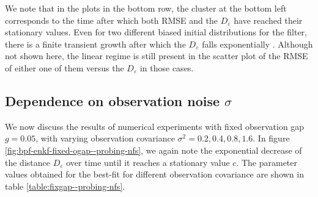 We note that in the plots in the bottom row, the cluster at the bottom left corresponds to the time after which both RMSE and the $D_\varepsilon$ have reached their stationary values. Even for two different biased initial distributions for the filter, there is a finite transient growth after which the $D_\varepsilon$ falls exponentially \cite{mandal2021stability}. Although not shown here, the linear regime is still present in the scatter plot of the RMSE of either one of them versus the $D_\varepsilon$ in those cases. 

\subsection{Dependence on observation noise \texorpdfstring{$\sigma$}{Lg} }

We now discuss the results of numerical experiments with fixed observation gap $g = 0.05$, with varying observation covariance $\sigma^2 = 0.2, 0.4, 0.8, 1.6$. In figure \ref{fig:bpf-enkf-fixed-ogap--probing-nfs}, we again note the exponential decrease of the distance $D_\varepsilon$ over time until it reaches a stationary value $c$. The parameter values obtained for the best-fit for different observation covariance are shown in table \ref{table:fixgap--probing-nfs}.




